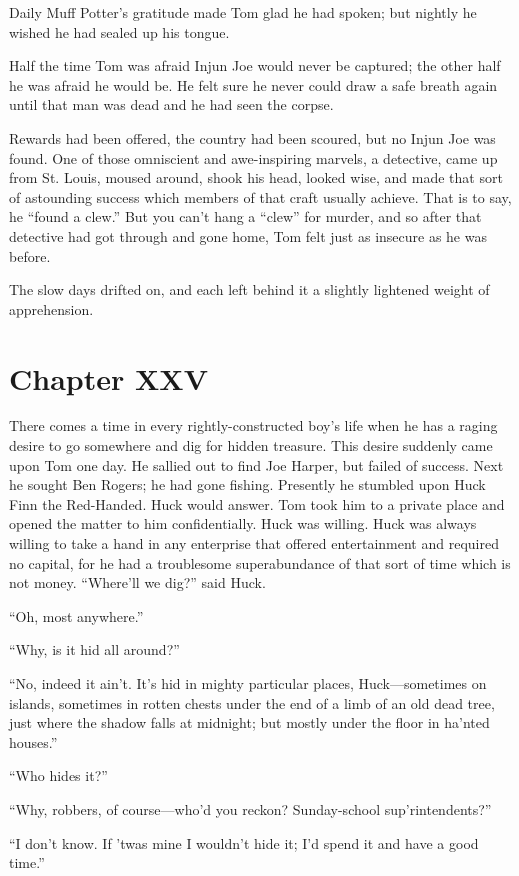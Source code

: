 \documentclass{book}
\begin{document}
Daily Muff Potter’s gratitude made Tom glad he had spoken; but nightly he wished he had sealed up his tongue.

Half the time Tom was afraid Injun Joe would never be captured; the other half he was afraid he would be. He felt sure he never could draw a safe breath again until that man was dead and he had seen the corpse.

Rewards had been offered, the country had been scoured, but no Injun Joe was found. One of those omniscient and awe-inspiring marvels, a detective, came up from St. Louis, moused around, shook his head, looked wise, and made that sort of astounding success which members of that craft usually achieve. That is to say, he “found a clew.” But you can’t hang a “clew” for murder, and so after that detective had got through and gone home, Tom felt just as insecure as he was before.

The slow days drifted on, and each left behind it a slightly lightened weight of apprehension.

\chapter*{Chapter XXV}

There comes a time in every rightly-constructed boy’s life when he has a raging desire to go somewhere and dig for hidden treasure. This desire suddenly came upon Tom one day. He sallied out to find Joe Harper, but failed of success. Next he sought Ben Rogers; he had gone fishing. Presently he stumbled upon Huck Finn the Red-Handed. Huck would answer. Tom took him to a private place and opened the matter to him confidentially. Huck was willing. Huck was always willing to take a hand in any enterprise that offered entertainment and required no capital, for he had a troublesome superabundance of that sort of time which is not money. “Where’ll we dig?” said Huck.

“Oh, most anywhere.”

“Why, is it hid all around?”

“No, indeed it ain’t. It’s hid in mighty particular places, Huck—sometimes on islands, sometimes in rotten chests under the end of a limb of an old dead tree, just where the shadow falls at midnight; but mostly under the floor in ha’nted houses.”

“Who hides it?”

“Why, robbers, of course—who’d you reckon? Sunday-school sup’rintendents?”

“I don’t know. If ’twas mine I wouldn’t hide it; I’d spend it and have a good time.”
\end{document}
